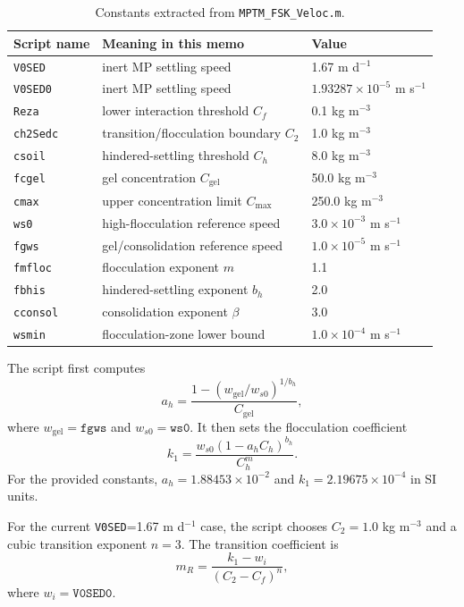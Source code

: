 \documentclass[11pt]{article}
\begin{document}
\begin{table}[h]
\centering
\caption{Constants extracted from \texttt{MPTM\_FSK\_Veloc.m}.}
\begin{tabular}{lll}
\toprule
Script name & Meaning in this memo & Value \\
\midrule
\texttt{V0SED} & inert MP settling speed & 1.67 m d$^{-1}$ \\
\texttt{V0SED0} & inert MP settling speed & $1.93287\times10^{-5}$ m s$^{-1}$ \\
\texttt{Reza} & lower interaction threshold $C_f$ & 0.1 kg m$^{-3}$ \\
\texttt{ch2Sedc} & transition/flocculation boundary $C_2$ & 1.0 kg m$^{-3}$ \\
\texttt{csoil} & hindered-settling threshold $C_h$ & 8.0 kg m$^{-3}$ \\
\texttt{fcgel} & gel concentration $C_{\mathrm{gel}}$ & 50.0 kg m$^{-3}$ \\
\texttt{cmax} & upper concentration limit $C_{\max}$ & 250.0 kg m$^{-3}$ \\
\texttt{ws0} & high-flocculation reference speed & $3.0\times10^{-3}$ m s$^{-1}$ \\
\texttt{fgws} & gel/consolidation reference speed & $1.0\times10^{-5}$ m s$^{-1}$ \\
\texttt{fmfloc} & flocculation exponent $m$ & 1.1 \\
\texttt{fbhis} & hindered-settling exponent $b_h$ & 2.0 \\
\texttt{cconsol} & consolidation exponent $\beta$ & 3.0 \\
\texttt{wsmin} & flocculation-zone lower bound & $1.0\times10^{-4}$ m s$^{-1}$ \\
\bottomrule
\end{tabular}
\end{table}

The script first computes
\begin{equation}
  a_h =
  \frac{1-\left(w_{\mathrm{gel}}/w_{s0}\right)^{1/b_h}}
       {C_{\mathrm{gel}}},
\end{equation}
where $w_{\mathrm{gel}}=\texttt{fgws}$ and $w_{s0}=\texttt{ws0}$.  It then
sets the flocculation coefficient
\begin{equation}
  k_1 =
  \frac{w_{s0}\left(1-a_h C_h\right)^{b_h}}
       {C_h^m}.
\end{equation}
For the provided constants, $a_h=1.88453\times10^{-2}$ and
$k_1=2.19675\times10^{-4}$ in SI units.

For the current \texttt{V0SED}=1.67 m d$^{-1}$ case, the script chooses
$C_2=1.0$ kg m$^{-3}$ and a cubic transition exponent $n=3$.  The transition
coefficient is
\begin{equation}
  m_R = \frac{k_1-w_i}{(C_2-C_f)^n},
\end{equation}
where $w_i=\texttt{V0SED0}$.
\end{document}
